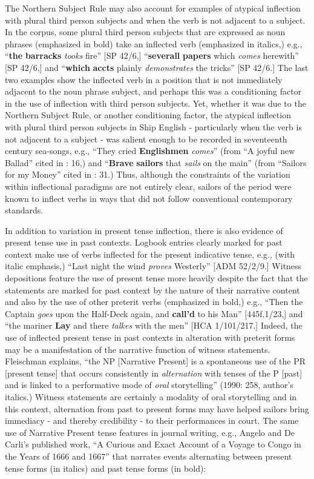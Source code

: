 The Northern Subject Rule may also account for examples of atypical inflection with plural third person subjects and when the verb is not adjacent to a subject. In the corpus, some plural third person subjects that are expressed as noun phrases (emphasized in bold) take an inflected verb (emphasized in italics,) e.g., “\textbf{the} \textbf{barracks} \textit{tooks} fire” [SP 42/6,] “\textbf{severall} \textbf{papers} which \textit{comes} herewith” [SP 42/6,] and “\textbf{which} \textbf{accts} plainly \textit{demonstrates} the tricks” [SP 42/6.] The last two examples show the inflected verb in a position that is not immediately adjacent to the noun phrase subject, and perhaps this was a conditioning factor in the use of inflection with third person subjects. Yet, whether it was due to the Northern Subject Rule, or another conditioning factor, the atypical inflection with plural third person subjects in Ship English - particularly when the verb is not adjacent to a subject - was salient enough to be recorded in seventeenth century sea-songs, e.g., “They cried \textbf{Englishmen} \textit{comes}” (from “A joyful new Ballad” cited in \citealt{Palmer1986}: 16,) and “\textbf{Brave} \textbf{sailors} that \textit{sails} on the main” (from “Sailors for my Money” cited in \citealt{Palmer1986}: 31.) Thus, although the constraints of the variation within inflectional paradigms are not entirely clear, sailors of the period were known to inflect verbs in ways that did not follow conventional contemporary standards. 

In addition to variation in present tense inflection, there is also evidence of present tense use in past contexts. Logbook entries clearly marked for past context make use of verbs inflected for the present indicative tense, e.g., (with italic emphasis,) “Last night the wind \textit{proves} Westerly” [ADM 52/2/9.] Witness depositions feature the use of present tense more heavily despite the fact that the statements are marked for past context by the nature of their narrative content and also by the use of other preterit verbs (emphasized in bold,) e.g., “Then the Captain \textit{goes} upon the Half-Deck again, and \textbf{call’d} to his Man” [445f.1/23,] and “the mariner \textbf{Lay} and there \textit{talkes} with the men” [HCA 1/101/217.] Indeed, the use of inflected present tense in past contexts in alteration with preterit forms may be a manifestation of the narrative function of witness statements. Fleischman explains, “the NP [Narrative Present] is a spontaneous use of the PR [present tense] that occurs consistently in \textit{alternation} with tenses of the P [past] and is linked to a performative mode of \textit{oral} storytelling” (1990: 258, author’s italics.) Witness statements are certainly a modality of oral storytelling and in this context, alternation from past to present forms may have helped sailors bring immediacy - and thereby credibility - to their performances in court. The same use of Narrative Present tense features in journal writing, e.g., Angelo and De Carli’s published work, “A Curious and Exact Account of a Voyage to Congo in the Years of 1666 and 1667” that narrates events alternating between present tense forms (in italics) and past tense forms (in bold):

